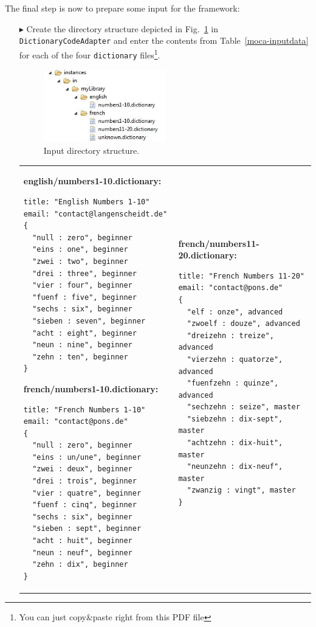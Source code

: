 The final step is now to prepare some input for the framework:
\begin{enumerate}
  \item[$\blacktriangleright$] Create the directory structure depicted in Fig.~\ref{fig:moca-inputdata} in \texttt{Dictionary\-Code\-Adapter} and enter the contents from Table~\ref{moca-inputdata} for each of the four \texttt{dictionary} files\footnote{You can just copy\&paste right from this PDF file}.
\begin{figure}[htp]
\begin{center}
  \includegraphics[width=0.5\textwidth]{pics/moca/2TextToMocaTree/inputData}
  \caption{Input directory structure.}
  \label{fig:moca-inputdata}
\end{center}
\end{figure}

\begin{table}
\begin{tabular}{p{6cm} p{6cm} }
\footnotesize
\textbf{english/numbers1-10.dictionary:}
\begin{verbatim}
title: "English Numbers 1-10"
email: "contact@langenscheidt.de"	
{
  "null : zero", beginner
  "eins : one", beginner
  "zwei : two", beginner
  "drei : three", beginner
  "vier : four", beginner
  "fuenf : five", beginner
  "sechs : six", beginner
  "sieben : seven", beginner
  "acht : eight", beginner
  "neun : nine", beginner
  "zehn : ten", beginner 
}
\end{verbatim} 

\textbf{french/numbers1-10.dictionary:}
\begin{verbatim}   
title: "French Numbers 1-10"
email: "contact@pons.de"	
{
  "null : zero", beginner
  "eins : un/une", beginner
  "zwei : deux", beginner
  "drei : trois", beginner
  "vier : quatre", beginner
  "fuenf : cinq", beginner
  "sechs : six", beginner
  "sieben : sept", beginner
  "acht : huit", beginner
  "neun : neuf", beginner
  "zehn : dix", beginner 
}
\end{verbatim}
&

\footnotesize
\textbf{french/numbers11-20.dictionary:}
\begin{verbatim}
title: "French Numbers 11-20"
email: "contact@pons.de"	
{
  "elf : onze", advanced
  "zwoelf : douze", advanced
  "dreizehn : treize", advanced
  "vierzehn : quatorze", advanced
  "fuenfzehn : quinze", advanced
  "sechzehn : seize", master
  "siebzehn : dix-sept", master
  "achtzehn : dix-huit", master
  "neunzehn : dix-neuf", master
  "zwanzig : vingt", master
}


\end{verbatim}
\end{tabular}
\end{table}
\end{enumerate}
